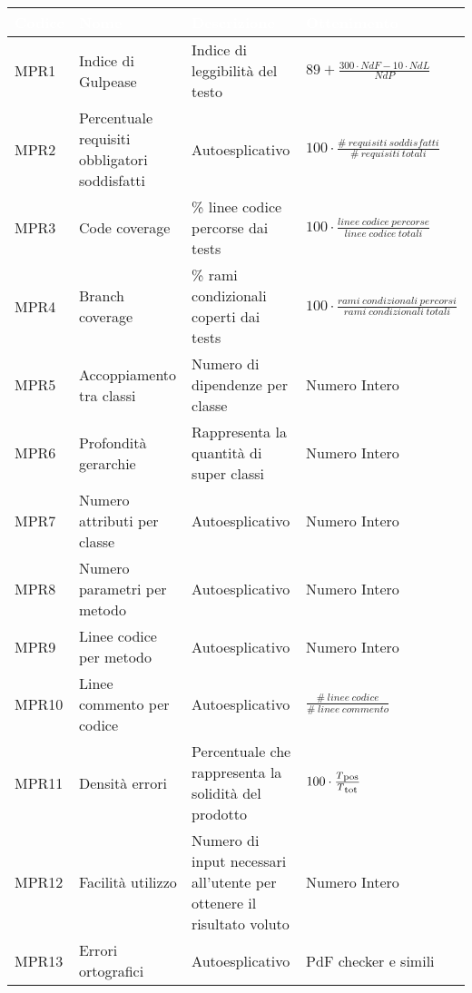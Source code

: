 {
    
    \setlength{\freewidth}{\dimexpr\textwidth-10\tabcolsep}
    \renewcommand{\arraystretch}{1.5}
    \centering
    \setlength{\aboverulesep}{0pt}
    \setlength{\belowrulesep}{0pt}
    \begin{longtable}{C{.115\freewidth} C{.257\freewidth} C{.26\freewidth} C{.4\freewidth}}
       \toprule
    \textcolor{white}{\textbf{Codice}}&
    \textcolor{white}{\textbf{Nome}}&
    \textcolor{white}{\textbf{Descrizione}}&
    \textcolor{white}{\textbf{Ottenimento}}\\	
    \toprule
    \endhead

    
    MPR1 & Indice di Gulpease & Indice di leggibilità del testo & $89+\frac{300\cdot NdF-10\cdot NdL}{NdP}$  \\
    MPR2 & Percentuale requisiti obbligatori soddisfatti & Autoesplicativo & $100\cdot \frac{\# \: requisiti \: soddisfatti}{\# \: requisiti \: totali}$ \\
    MPR3 & Code coverage & \% linee codice percorse dai tests & $100\cdot \frac{linee \: codice \: percorse}{linee \: codice \: totali}$ \\
    MPR4 & Branch coverage & \% rami condizionali coperti dai tests  & $100\cdot \frac{rami \: condizionali \: percorsi}{rami \: condizionali \: totali}$ \\
    MPR5 & Accoppiamento tra classi & Numero di dipendenze per classe & Numero Intero \\
    MPR6 & Profondità gerarchie & Rappresenta la quantità di super classi & Numero Intero \\
    MPR7 & Numero attributi per classe & Autoesplicativo & Numero Intero \\
    MPR8 & Numero parametri per metodo & Autoesplicativo & Numero Intero \\
    MPR9 & Linee codice per metodo & Autoesplicativo & Numero Intero \\
    MPR10 & Linee commento per codice & Autoesplicativo & $\frac{\# \: linee \: codice}{\# \: linee \: commento}$ \\
    MPR11 & Densità errori & Percentuale che rappresenta la solidità del prodotto & $100\cdot \frac{T\textsubscript{pos}}{T\textsubscript{tot}}$ \\
    MPR12 & Facilità utilizzo  & Numero di input necessari all'utente per ottenere il risultato voluto & Numero Intero \\
    MPR13 & Errori ortografici & Autoesplicativo & PdF checker e simili \\

\end{longtable}}
